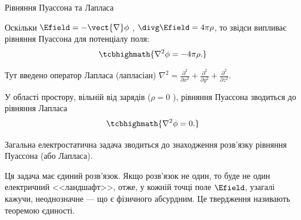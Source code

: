 \documentclass{beamer}
\begin{document}
\begin{frame}{Рівняння Пуассона та Лапласа}
	\begin{block}{}\small
		Оскільки $\Efield = - \vect{\nabla}\phi$ , $\divg\Efield  = 4\pi\rho$, то
		звідси випливає \alert{рівняння Пуассона для потенціалу поля}:
		\begin{equation*}
			\tcbhighmath{
				\nabla^2\phi = - 4\pi\rho.
			}
		\end{equation*}
	\end{block}
	\begin{block}{}\scriptsize
		Тут введено оператор Лапласа (лапласіан)
		$
			\nabla^2 = \frac{\partial^2}{\partial x^2} +
			\frac{\partial^2}{\partial y^2} + \frac{\partial^2}{\partial z^2}
		$.
	\end{block}
	\begin{block}{}\small
		У області простору, вільній від зарядів ($\rho = 0$ ), рівняння Пуассона
		зводиться до \alert{рівняння Лапласа}
		\begin{equation*}
			\tcbhighmath{
				\nabla^2\phi = 0 .
			}
		\end{equation*}
	\end{block}

	\begin{block}{}\justifying\scriptsize
		Загальна електростатична задача зводиться до знаходження розв'язку
		рівняння Пуассона (або Лапласа).

		\medskip

		Ця задача має \alert{єдиний розв'язок}. Якщо розв'язок не один, то буде не один електричний
		<<ландшафт>>, отже, у кожній точці поле $\Efield$, узагалі кажучи, неоднозначне --- що є
		фізичного абсурдним. Це твердження називають \alert{теоремою єдиності}.
	\end{block}
\end{frame}
\end{document}
